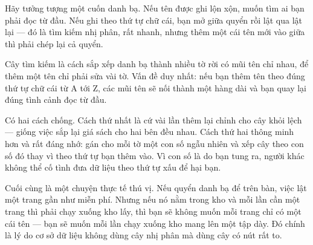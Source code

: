\documentclass[../../algorithm.tex]{subfiles}
\begin{document}
\begin{dongian}
Hãy tưởng tượng một cuốn danh bạ. Nếu tên được ghi lộn xộn, muốn tìm ai bạn phải đọc từ đầu. Nếu ghi theo thứ tự chữ cái, bạn mở giữa quyển rồi lật qua lật lại --- đó là tìm kiếm nhị phân, rất nhanh, nhưng thêm một cái tên mới vào giữa thì phải chép lại cả quyển.

Cây tìm kiếm là cách sắp xếp danh bạ thành nhiều tờ rời có mũi tên chỉ nhau, để thêm một tên chỉ phải sửa vài tờ. Vấn đề duy nhất: nếu bạn thêm tên theo đúng thứ tự chữ cái từ A tới Z, các mũi tên sẽ nối thành một hàng dài và bạn quay lại đúng tình cảnh đọc từ đầu.

Có hai cách chống. Cách thứ nhất là cứ vài lần thêm lại chỉnh cho cây khỏi lệch --- giống việc sắp lại giá sách cho hai bên đều nhau. Cách thứ hai thông minh hơn và rất đáng nhớ: gán cho mỗi tờ một con số ngẫu nhiên và xếp cây theo con số đó thay vì theo thứ tự bạn thêm vào. Vì con số là do bạn tung ra, người khác không thể cố tình đưa dữ liệu theo thứ tự xấu để hại bạn.

Cuối cùng là một chuyện thực tế thú vị. Nếu quyển danh bạ để trên bàn, việc lật một trang gần như miễn phí. Nhưng nếu nó nằm trong kho và mỗi lần cần một trang thì phải chạy xuống kho lấy, thì bạn sẽ không muốn mỗi trang chỉ có một cái tên --- bạn sẽ muốn mỗi lần chạy xuống kho mang lên một tập dày. Đó chính là lý do cơ sở dữ liệu không dùng cây nhị phân mà dùng cây có nút rất to.
\end{dongian}
\end{document}
